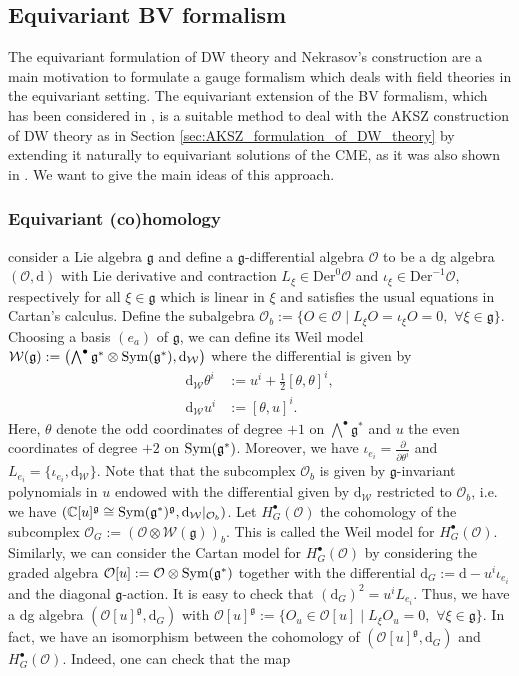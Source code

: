 \documentclass[11pt,colorinlistoftodos]{amsart}
\numberwithin{equation}{subsection}
\theoremstyle{plain}
\theoremstyle{definition}
\theoremstyle{remark}
\newcommand{\dd}{{\mathrm{d}}}
\newcommand{\C}{\mathbb{C}}
\newcommand{\de}{\partial}
\newcommand{\calO}{\mathcal{O}}
\newcommand{\calW}{\mathcal{W}}
\newcommand{\Sym}{\textnormal{Sym}}
\begin{document}
\subsection{Equivariant BV formalism}
\label{subsec:equivariant_BV_formalism}
The equivariant formulation of DW theory and Nekrasov's construction are a main motivation to formulate a gauge formalism which deals with field theories in the equivariant setting. The equivariant extension of the BV formalism, which has been considered in \cite{CattZabz2019}, is a suitable method to deal with the AKSZ construction of DW theory as in Section \ref{sec:AKSZ_formulation_of_DW_theory} by extending it naturally to equivariant solutions of the CME, as it was also shown in \cite{CattZabz2019}. We want to give the main ideas of this approach. 
\subsubsection{Equivariant (co)homology}
consider a Lie algebra $\mathfrak{g}$ and define a $\mathfrak{g}$-differential algebra $\calO$ to be a dg algebra $(\calO,\dd)$ with Lie derivative and contraction $L_\xi\in\mathrm{Der}^0\calO$ and $\iota_\xi\in\mathrm{Der}^{-1}\calO$, respectively for all $\xi\in\mathfrak{g}$ which is linear in $\xi$ and satisfies the usual equations in Cartan's calculus. Define the subalgebra $\calO_b:=\{O\in \calO\mid L_\xi O=\iota_{\xi}O=0,\,\, \forall \xi\in\mathfrak{g}\}$. Choosing a basis $(e_a)$ of $\mathfrak{g}$, we can define its Weil model $\calW(\mathfrak{g}):=\left(\bigwedge^\bullet\mathfrak{g}^*\otimes \Sym(\mathfrak{g}^*),\dd_\calW\right)$ where the differential is given by 
\begin{align}
    \dd_\calW\theta^i&:=u^i+\frac{1}{2}[\theta,\theta]^i,\\
    \dd_\calW u^i&:= [\theta,u]^i.
\end{align}
Here, $\theta$ denote the odd coordinates of degree $+1$ on $\bigwedge^\bullet\mathfrak{g}^*$ and $u$ the even coordinates of degree $+2$ on $\Sym(\mathfrak{g}^*)$. Moreover, we have $\iota_{e_i}=\frac{\de}{\de\theta^i}$ and $L_{e_i}=\{\iota_{e_i},\dd_\calW\}$. Note that that the subcomplex $\calO_b$ is given by $\mathfrak{g}$-invariant polynomials in $u$ endowed with the differential given by $\dd_\calW$ restricted to $\calO_b$, i.e. we have $(\C[u]^\mathfrak{g}\cong \Sym(\mathfrak{g}^*)^\mathfrak{g},\dd_\calW\vert_{\calO_b})$. Let $H^\bullet_G(\calO)$ the cohomology of the subcomplex $\calO_G:=(\calO\otimes \calW(\mathfrak{g}))_b$. This is called the Weil model for $H^\bullet_G(\calO)$. Similarly, we can consider the Cartan model for $H^\bullet_G(\calO)$ by considering the graded algebra $\calO[u]:=\calO\otimes \Sym(\mathfrak{g}^*)$ together with the differential $\dd_G:=\dd-u^i\iota_{e_i}$ and the diagonal $\mathfrak{g}$-action. It is easy to check that $(\dd_G)^2=u^iL_{e_i}$. Thus, we have a dg algebra $(\calO[u]^\mathfrak{g},\dd_G)$ with $\calO[u]^\mathfrak{g}:=\{O_u\in\calO[u]\mid L_\xi O_u=0,\,\, \forall \xi\in\mathfrak{g}\}$. In fact, we have an isomorphism between the cohomology of $(\calO[u]^\mathfrak{g},\dd_G)$ and $H^\bullet_G(\calO)$. Indeed, one can check that the map 
\end{document}
